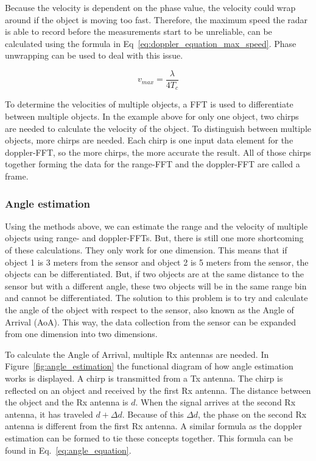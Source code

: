 Because the velocity is dependent on the phase value, the velocity could wrap around if the object is moving too fast. Therefore, the maximum speed the radar is able to record before the measurements start to be unreliable, can be calculated using the formula in Eq~\ref{eq:doppler_equation_max_speed}. Phase unwrapping can be used to deal with this issue.

\begin{equation}
v_{max} = \frac{\lambda}{4 T_c}
\label{eq:doppler_equation_max_speed}
\end{equation}

To determine the velocities of multiple objects, a FFT is used to differentiate between multiple objects. In the example above for only one object, two chirps are needed to calculate the velocity of the object. To distinguish between multiple objects, more chirps are needed. Each chirp is one input data element for the doppler-FFT, so the more chirps, the more accurate the result. All of those chirps together forming the data for the range-FFT and the doppler-FFT are called a frame. 

\subsubsection{Angle estimation}
\label{sec:angle_estimation}
Using the methods above, we can estimate the range and the velocity of multiple objects using range- and doppler-FFTs. But, there is still one more shortcoming of these calculations. They only work for one dimension. This means that if object 1 is 3 meters from the sensor and object 2 is 5 meters from the sensor, the objects can be differentiated. But, if two objects are at the same distance to the sensor but with a different angle, these two objects will be in the same range bin and cannot be differentiated. The solution to this problem is to try and calculate the angle of the object with respect to the sensor, also known as the Angle of Arrival (AoA). This way, the data collection from the sensor can be expanded from one dimension into two dimensions.

To calculate the Angle of Arrival, multiple Rx antennas are needed. In Figure~\ref{fig:angle_estimation} the functional diagram of how angle estimation works is displayed. A chirp is transmitted from a Tx antenna. The chirp is reflected on an object and received by the first Rx antenna. The distance between the object and the Rx antenna is $d$. When the signal arrives at the second Rx antenna, it has traveled $d + \Delta d$. Because of this $\Delta d$, the phase on the second Rx antenna is different from the first Rx antenna. A similar formula as the doppler estimation can be formed to tie these concepts together. This formula can be found in Eq.~\ref{eq:angle_equation}.

